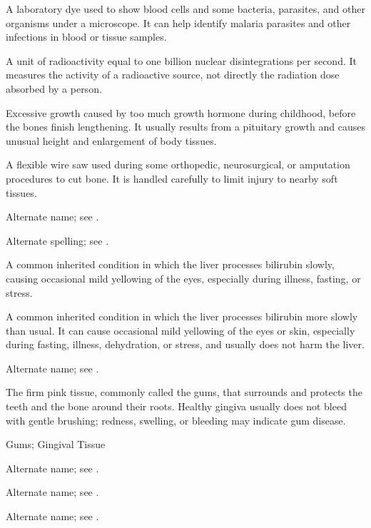  A laboratory dye used to show blood cells and some bacteria, parasites, and other organisms under a microscope. It can help identify malaria parasites and other infections in blood or tissue samples.

 A unit of radioactivity equal to one billion nuclear disintegrations per second. It measures the activity of a radioactive source, not directly the radiation dose absorbed by a person.

 Excessive growth caused by too much growth hormone during childhood, before the bones finish lengthening. It usually results from a pituitary growth and causes unusual height and enlargement of body tissues.

 A flexible wire saw used during some orthopedic, neurosurgical, or amputation procedures to cut bone. It is handled carefully to limit injury to nearby soft tissues.

 Alternate name; see .

 Alternate spelling; see .

 A common inherited condition in which the liver processes bilirubin slowly, causing occasional mild yellowing of the eyes, especially during illness, fasting, or stress.

 A common inherited condition in which the liver processes bilirubin more slowly than usual. It can cause occasional mild yellowing of the eyes or skin, especially during fasting, illness, dehydration, or stress, and usually does not harm the liver.

 Alternate name; see .

 The firm pink tissue, commonly called the gums, that surrounds and protects the teeth and the bone around their roots. Healthy gingiva usually does not bleed with gentle brushing; redness, swelling, or bleeding may indicate gum disease.

\synonyms
Gums; Gingival Tissue

 Alternate name; see .

 Alternate name; see .

 Alternate name; see .

